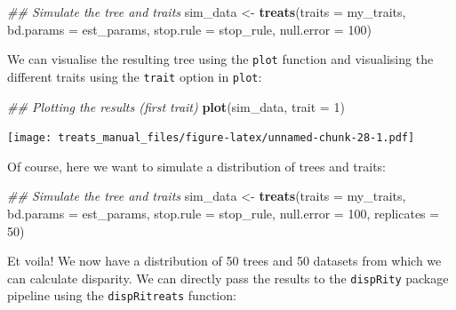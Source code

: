 \documentclass[
]{book}
\newenvironment{Shaded}{\begin{snugshade}}{\end{snugshade}}
\newcommand{\CommentTok}[1]{\textcolor[rgb]{0.56,0.35,0.01}{\textit{#1}}}
\newcommand{\DataTypeTok}[1]{\textcolor[rgb]{0.13,0.29,0.53}{#1}}
\newcommand{\DecValTok}[1]{\textcolor[rgb]{0.00,0.00,0.81}{#1}}
\newcommand{\KeywordTok}[1]{\textcolor[rgb]{0.13,0.29,0.53}{\textbf{#1}}}
\newcommand{\NormalTok}[1]{#1}
\newcommand{\StringTok}[1]{\textcolor[rgb]{0.31,0.60,0.02}{#1}}
\begin{document}
\begin{Shaded}
\begin{Highlighting}[]
\CommentTok{\#\# Simulate the tree and traits}
\NormalTok{sim\_data \textless{}{-}}\StringTok{ }\KeywordTok{treats}\NormalTok{(}\DataTypeTok{traits     =}\NormalTok{ my\_traits,}
                   \DataTypeTok{bd.params  =}\NormalTok{ est\_params,}
                   \DataTypeTok{stop.rule  =}\NormalTok{ stop\_rule,}
                   \DataTypeTok{null.error =} \DecValTok{100}\NormalTok{)}
\end{Highlighting}
\end{Shaded}

We can visualise the resulting tree using the \texttt{plot} function and visualising the different traits using the \texttt{trait} option in \texttt{plot}:

\begin{Shaded}
\begin{Highlighting}[]
\CommentTok{\#\# Plotting the results (first trait)}
\KeywordTok{plot}\NormalTok{(sim\_data, }\DataTypeTok{trait =} \DecValTok{1}\NormalTok{)}
\end{Highlighting}
\end{Shaded}

\texttt{[image: treats\_manual\_files/figure-latex/unnamed-chunk-28-1.pdf]}

Of course, here we want to simulate a distribution of trees and traits:

\begin{Shaded}
\begin{Highlighting}[]
\CommentTok{\#\# Simulate the tree and traits}
\NormalTok{sim\_data \textless{}{-}}\StringTok{ }\KeywordTok{treats}\NormalTok{(}\DataTypeTok{traits     =}\NormalTok{ my\_traits,}
                   \DataTypeTok{bd.params  =}\NormalTok{ est\_params,}
                   \DataTypeTok{stop.rule  =}\NormalTok{ stop\_rule,}
                   \DataTypeTok{null.error =} \DecValTok{100}\NormalTok{,}
                   \DataTypeTok{replicates =} \DecValTok{50}\NormalTok{)}
\end{Highlighting}
\end{Shaded}

Et voila! We now have a distribution of 50 trees and 50 datasets from which we can calculate disparity.
We can directly pass the results to the \texttt{dispRity} package pipeline using the \texttt{dispRitreats} function:
\end{document}
